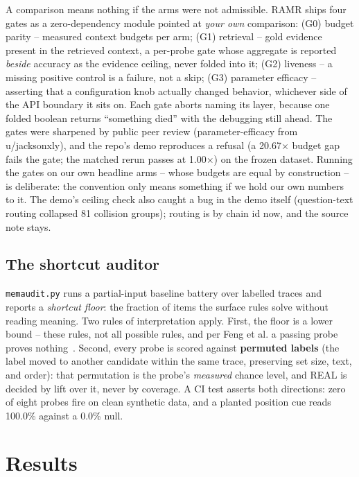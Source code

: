 \documentclass[11pt]{article}
\begin{document}
A comparison means nothing if the arms were not admissible. RAMR ships four gates as a zero-dependency
module pointed at \emph{your own} comparison: (G0) budget parity -- measured context budgets per arm;
(G1) retrieval -- gold evidence present in the retrieved context, a per-probe gate whose aggregate is
reported \emph{beside} accuracy as the evidence ceiling, never folded into it; (G2) liveness -- a
missing positive control is a failure, not a skip; (G3) parameter efficacy -- asserting that a
configuration knob actually changed behavior, whichever side of the API boundary it sits on. Each gate
aborts naming its layer, because one folded boolean returns ``something died'' with the debugging still
ahead. The gates were sharpened by public peer review (parameter-efficacy from u/jacksonxly), and the
repo's demo reproduces a refusal (a 20.67$\times$ budget gap fails the gate; the matched rerun passes
at 1.00$\times$) on the frozen dataset. Running the gates on our own headline arms -- whose budgets are
equal by construction -- is deliberate: the convention only means something if we hold our own numbers
to it. The demo's ceiling check also caught a bug in the demo itself (question-text routing collapsed
81 collision groups); routing is by chain id now, and the source note stays.

\subsection{The shortcut auditor}

\texttt{memaudit.py} runs a partial-input baseline battery over labelled traces and reports a
\emph{shortcut floor}: the fraction of items the surface rules solve without reading meaning. Two rules
of interpretation apply. First, the floor is a lower bound -- these rules, not all possible rules, and
per Feng et al. a passing probe proves nothing~\cite{feng2019}. Second, every probe is scored against
\textbf{permuted labels} (the label moved to another candidate within the same trace, preserving set
size, text, and order): that permutation is the probe's \emph{measured} chance level, and REAL is
decided by lift over it, never by coverage. A CI test asserts both directions: zero of eight probes
fire on clean synthetic data, and a planted position cue reads 100.0\% against a 0.0\% null.

\section{Results}
\label{sec:results}
\end{document}
